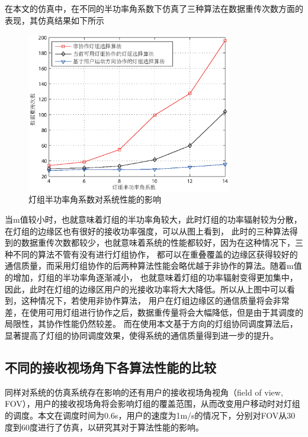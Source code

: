 在本文的仿真中，在不同的半功率角系数下仿真了三种算法在数据重传次数方面的表现，其仿真结果如下所示

\begin{figure}[htbp]
    \centering
	\includegraphics[width=0.8\textwidth]{figures/chapter-4/DistributionLedParam.eps}
	\caption{灯组半功率角系数对系统性能的影响}
	\label{fig:distribution-led-param}
\end{figure}

当m值较小时，也就意味着灯组的半功率角较大，此时灯组的功率辐射较为分散，在灯组的边缘区也有很好的接收功率强度，可以从图上看到，
此时的三种算法得到的数据重传次数都较少，也就意味着系统的性能都较好，因为在这种情况下，三种不同的算法不管有没有进行灯组协作，
都可以在重叠覆盖的边缘区获得较好的通信质量，而采用灯组协作的后两种算法性能会略优越于非协作的算法。随着m值的增加，灯组的半功率角逐渐减小，
也就意味着灯组的功率辐射变得更加集中，因此，此时在灯组的边缘区用户的光接收功率将大大降低。所以从上图中可以看到，这种情况下，若使用非协作算法，
用户在灯组边缘区的通信质量将会非常差，在使用可用灯组进行协作之后，数据重传量将会大幅降低，但是由于其调度的局限性，其协作性能仍然较差。
而在使用本文基于方向的灯组协同调度算法后，显著提高了灯组的协同调度效果，使得系统的通信质量得到进一步的提升。

\subsection{不同的接收视场角下各算法性能的比较}
同样对系统的仿真系统存在影响的还有用户的接收视场角视角（field of view, FOV），用户的接收视场角将会影响灯组的覆盖范围，从而改变用户移动时对灯组的调度。本文在调度时间为0.6s，用户的速度为1m/s的情况下，分别对FOV从30度到60度进行了仿真，以研究其对于算法性能的影响。

